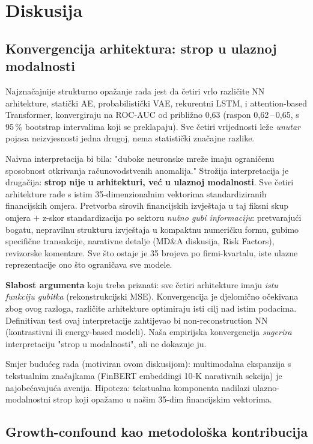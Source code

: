 \documentclass[diplomskirad,authoryear]{fer}
\begin{document}
\chapter{Diskusija}

\section{Konvergencija arhitektura: strop u ulaznoj modalnosti}

Najznačajnije strukturno opažanje rada jest da četiri vrlo različite NN arhitekture, statički AE, probabilistički VAE, rekurentni LSTM, i attention-based Transformer, konvergiraju na ROC-AUC od približno 0,63 (raspon 0,62\,--\,0,65, s 95\,\% bootstrap intervalima koji se preklapaju). Sve četiri vrijednosti leže \emph{unutar} pojasa neizvjesnosti jedna drugoj, nema statistički značajne razlike.

Naivna interpretacija bi bila: "duboke neuronske mreže imaju ograničenu sposobnost otkrivanja računovodstvenih anomalija." Strožija interpretacija je drugačija: \textbf{strop nije u arhitekturi, već u ulaznoj modalnosti}. Sve četiri arhitekture rade s istim 35-dimenzionalnim vektorima standardiziranih financijskih omjera. Pretvorba sirovih financijskih izvještaja u taj fiksni skup omjera $+$ z-skor standardizacija po sektoru \emph{nužno gubi informaciju}: pretvarajući bogatu, nepravilnu strukturu izvještaja u kompaktnu numeričku formu, gubimo specifične transakcije, narativne detalje (MD\&A diskusija, Risk Factors), revizorske komentare. Sve što ostaje je 35 brojeva po firmi-kvartalu, iste ulazne reprezentacije ono što ograničava sve modele.

\textbf{Slabost argumenta} koju treba priznati: sve četiri arhitekture imaju \emph{istu funkciju gubitka} (rekonstrukcijski MSE). Konvergencija je djelomično očekivana zbog ovog razloga, različite arhitekture optimiraju isti cilj nad istim podacima. Definitivan test ovaj interpretacije zahtijevao bi non-reconstruction NN (kontrastivni ili energy-based modeli). Naša empirijska konvergencija \emph{sugerira} interpretaciju "strop u modalnosti", ali ne dokazuje ju.

Smjer budućeg rada (motiviran ovom diskusijom): multimodalna ekspanzija s tekstualnim značajkama (FinBERT embeddingi 10-K narativnih sekcija) je najobećavajuća avenija. Hipoteza: tekstualna komponenta nadilazi ulazno-modalnostni strop koji opažamo u našim 35-dim financijskim vektorima.

\section{Growth-confound kao metodološka kontribucija}
\end{document}
